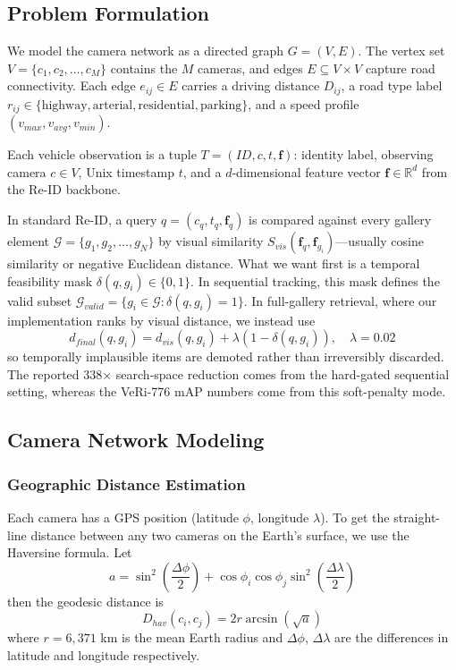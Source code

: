 \documentclass{ijitcs}
\newcommand{\rev}[1]{#1}
\begin{document}
\subsection{Problem Formulation}
We model the camera network as a directed graph $G = (V, E)$. The vertex set $V = \{c_1, c_2, \ldots, c_M\}$ contains the $M$ cameras, and edges $E \subseteq V \times V$ capture road connectivity. Each edge $e_{ij} \in E$ carries a driving distance $D_{ij}$, a road type label $r_{ij} \in \{\text{highway}, \text{arterial}, \text{residential}, \text{parking}\}$, and a speed profile $(v_{max}, v_{avg}, v_{min})$.

Each vehicle observation is a tuple $T = (ID, c, t, \mathbf{f})$: identity label, observing camera $c \in V$, Unix timestamp $t$, and a $d$-dimensional feature vector $\mathbf{f} \in \mathbb{R}^d$ from the Re-ID backbone.

In standard Re-ID, a query $q = (c_q, t_q, \mathbf{f}_q)$ is compared against every gallery element $\mathcal{G} = \{g_1, g_2, \ldots, g_N\}$ by visual similarity $S_{vis}(\mathbf{f}_q, \mathbf{f}_{g_i})$---usually cosine similarity or negative Euclidean distance. \rev{What we want first is a temporal feasibility mask $\delta(q, g_i) \in \{0,1\}$. In sequential tracking, this mask defines the valid subset $\mathcal{G}_{valid} = \{g_i \in \mathcal{G} : \delta(q, g_i)=1\}$. In full-gallery retrieval, where our implementation ranks by visual distance, we instead use}
\begin{equation}
    \rev{d_{final}(q,g_i) = d_{vis}(q,g_i) + \lambda \left(1 - \delta(q,g_i)\right), \quad \lambda = 0.02}
\label{eq:soft_penalty}
\end{equation}
\rev{so temporally implausible items are demoted rather than irreversibly discarded. The reported 338$\times$ search-space reduction comes from the hard-gated sequential setting, whereas the VeRi-776 mAP numbers come from this soft-penalty mode.}

\subsection{Camera Network Modeling}
\subsubsection{Geographic Distance Estimation}
Each camera has a GPS position (latitude $\phi$, longitude $\lambda$). To get the straight-line distance between any two cameras on the Earth's surface, we use the Haversine formula. Let
\begin{equation}
    a = \sin^2\!\left(\frac{\Delta\phi}{2}\right) + \cos \phi_i \cos \phi_j \sin^2\!\left(\frac{\Delta\lambda}{2}\right)
\label{eq:haversine_a}
\end{equation}
then the geodesic distance is
\begin{equation}
    D_{hav}(c_i, c_j) = 2r \arcsin\!\left(\sqrt{a}\right)
\label{eq:haversine}
\end{equation}
where $r = 6{,}371$ km is the mean Earth radius and $\Delta\phi$, $\Delta\lambda$ are the differences in latitude and longitude respectively.
\end{document}
